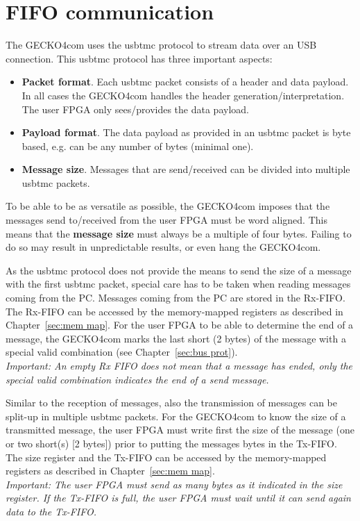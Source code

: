 \section{FIFO communication}
\label{sec:fifo com}
The {\sc GECKO4com} uses the {\sc usbtmc} protocol to stream data over an USB
connection. This {\sc usbtmc} protocol has three important aspects:
\begin{itemize}
\item \textbf{Packet format}. Each {\sc usbtmc} packet consists of a header and
data payload. In all cases the {\sc GECKO4com} handles the header
generation/interpretation. The user FPGA only sees/provides the data payload.
\item \textbf{Payload format}. The data payload as provided in an {\sc usbtmc}
packet is byte based, e.g. can be any number of bytes (minimal one).
\item \textbf{Message size}. Messages that are send/received can be divided into
multiple {\sc usbtmc} packets.
\end{itemize}
To be able to be as versatile as possible, the {\sc GECKO4com} imposes that the
messages send to/received from the user FPGA {\sc must} be word aligned. This
means that the \textbf{message size} {\sc must} always be a multiple of four bytes.
Failing to do so may result in unpredictable results, or even hang the {\sc
GECKO4com}.

As the {\sc usbtmc} protocol does not provide the means to send the size of a 
message with the first {\sc usbtmc} packet, special care has to be taken when
reading messages coming from the PC. Messages coming from the PC are stored in
the Rx-FIFO. The Rx-FIFO can be accessed by the memory-mapped registers as
described in Chapter~\ref{sec:mem map}. For the user FPGA to be able to
determine the end of a message, the {\sc GECKO4com} marks the last short (2
bytes) of the message with a special valid combination (see Chapter~\ref{sec:bus
prot}).\\
\textit{Important: An empty Rx FIFO does not mean that a message has ended, only
the special valid combination indicates the end of a send message.\important}

Similar to the reception of messages, also the transmission of messages can be
split-up in multiple {\sc usbtmc} packets. For the {\sc GECKO4com} to know the
size of a transmitted message, the user FPGA must write first the size of the
message (one or two short(s) [2 bytes]) prior to putting the messages bytes in
the Tx-FIFO. The size register and the Tx-FIFO can be accessed by the
memory-mapped registers as described in Chapter~\ref{sec:mem map}.\\
\textit{Important: The user FPGA {\sc must} send as many bytes as it indicated
in the size register. If the Tx-FIFO is full, the user FPGA {\sc must} wait
until it can send again data to the Tx-FIFO.\important}

